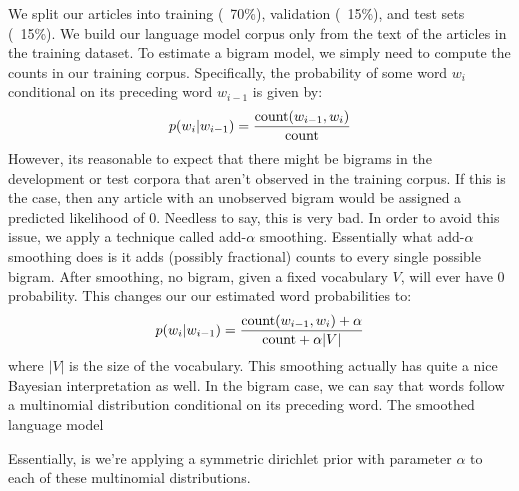 \documentclass[fleqn,12pt]{SelfArx} %
\begin{document}
We split our articles into training (~70\%), validation (~15\%), and test sets (~15\%). We build our language model corpus only from the text of the articles in the training dataset. To estimate a bigram model, we simply need to compute the counts in our training corpus. Specifically, the probability of some word $w_i$ conditional on its preceding word $w_{i-1}$ is given by:
\begin{equation}
p(w_i|w_{i-1}) = \frac{\textnormal{count}(w_{i-1},w_i)}{\textnormal{count}}
\end{equation}
However, its reasonable to expect that there might be bigrams in the development or test corpora that aren't observed in the training corpus. If this is the case, then any article with an unobserved bigram would be assigned a predicted likelihood of 0. Needless to say, this is very bad. In order to avoid this issue, we apply a technique called add-$\alpha$ smoothing. Essentially what add-$\alpha$ smoothing does is it adds (possibly fractional) counts to every single possible bigram. After smoothing, no bigram, given a fixed vocabulary $V$, will ever have 0 probability. This changes our our estimated word probabilities to:
\begin{equation}
p(w_i|w_{i-1}) = \frac{\textnormal{count}(w_{i-1},w_i) + \alpha}{\textnormal{count} + \alpha |V|}
\end{equation}
where $|V|$ is the size of the vocabulary. This smoothing actually has quite a nice Bayesian interpretation as well. In the bigram case, we can say that words follow a multinomial distribution conditional on its preceding word. The smoothed language model 

Essentially, is we're applying a symmetric dirichlet prior with parameter $\alpha$ to each of these multinomial distributions. 
\end{document}
